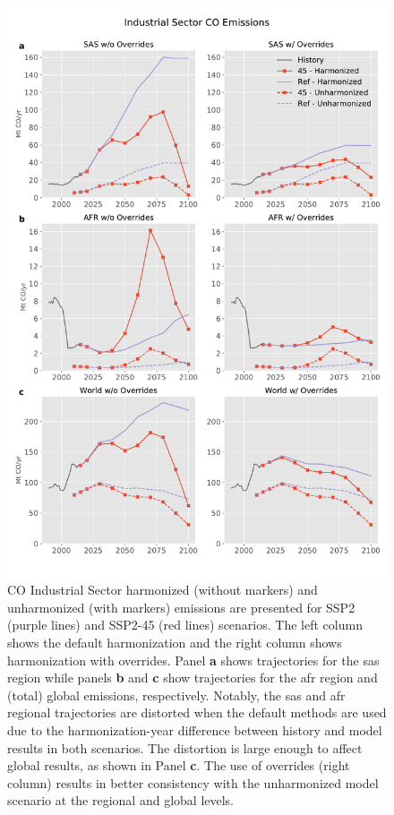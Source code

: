 \documentclass[review]{elsarticle}
\begin{document}
\begin{figure}
  \begin{center}
    \includegraphics[height=0.8\textheight]{sep_regions_results_CO_Industrial_Sector.pdf}
    \caption[]{
      \label{fig:co}
      CO Industrial Sector harmonized (without markers) and unharmonized (with
      markers) emissions are presented for SSP2 (purple lines) and SSP2-45 (red
      lines) scenarios. The left column shows the default harmonization and the right column shows harmonization with overrides. Panel \textbf{a} shows  trajectories for the \gls{sas} region
      while panels \textbf{b} and \textbf{c} show  trajectories for the
      \gls{afr} region and (total) global emissions, respectively. Notably, the
      \gls{sas} and \gls{afr} regional trajectories are distorted
      when the default methods are used due to the harmonization-year difference between history and
      model results in both scenarios. The distortion is large enough to affect
      global results, as shown in Panel \textbf{c}.  The use of overrides (right column) results in better consistency with the unharmonized model scenario at the regional and global levels. }
  \end{center}
\end{figure}
\end{document}
